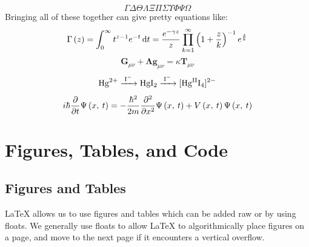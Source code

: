 \documentclass[11pt, twoside]{article}
\begin{document}
\begin{equation*}
    \Gamma \Delta \Theta \Lambda \Xi \Pi \Sigma \Upsilon \Phi \Psi \Omega
\end{equation*}
Bringing all of these together can give pretty equations like:
\begin{equation*}
    \Gamma\left( z \right) = \int_0^\infty t^{z - 1} e^{-t} \odif{t} = \frac{e^{-\gamma z}}{z} \prod_{k = 1}^\infty \left( 1 + \frac{z}{k} \right)^{-1} e^{\frac{z}{k}}
\end{equation*}
\begin{equation*}
    \symbf{G}_{\mu \nu} + \symbf{\Lambda} \symbf{g}_{\mu \nu} = \kappa \symbf{T}_{\mu \nu}
\end{equation*}
\begin{equation*}
    \ce{Hg^2+ ->[I-] HgI2 ->[I-] [Hg^{II}I4]^2-}
\end{equation*}
\begin{equation*}\label{eq:schrodingers_equation}
    i \hbar \pdv*{\Psi\left( x,\: t \right)}{t} = -\frac{\hbar^2}{2m} \pdv[order=2]{}{x} \Psi\left( x,\: t \right) + V\left( x,\: t \right) \Psi\left( x,\: t \right)
\end{equation*}
\newpage
\section{Figures, Tables, and Code}
\subsection{Figures and Tables}\label{sec:figures_and_tables}
\LaTeX{} allows us to use figures and tables which can be added raw or by using floats.
We generally use floats to allow \LaTeX{} to algorithmically place figures on a page, and
move to the next page if it encounters a vertical overflow.
\end{document}

